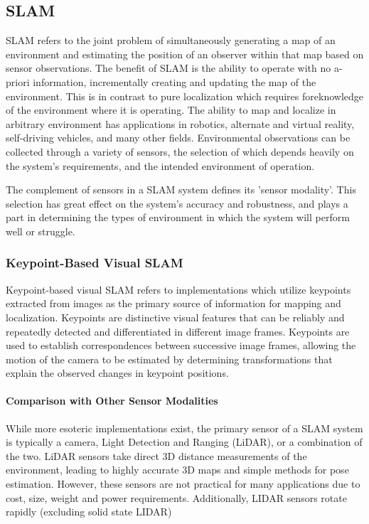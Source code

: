 \subsection{SLAM}

SLAM refers to the joint problem of simultaneously generating a map of an environment and estimating the position of an observer within that map based on sensor observations. The benefit of SLAM is the ability to operate with no a-priori information, incrementally creating and updating the map of the environment. This is in contrast to pure localization which requires foreknowledge of the environment where it is operating. The ability to map and localize in arbitrary environment has applications in robotics, alternate and virtual reality, self-driving vehicles, and many other fields. Environmental observations can be collected through a variety of sensors, the selection of which depends heavily on the system's requirements, and the intended environment of operation.

The complement of sensors in a SLAM system defines its 'sensor modality'. This selection has great effect on the system's accuracy and robustness, and plays a part in determining the types of environment in which the system will perform well or struggle.

\subsubsection{Keypoint-Based Visual SLAM}

Keypoint-based visual SLAM refers to implementations which utilize keypoints extracted from images as the primary source of information for mapping and localization. Keypoints are distinctive visual features that can be reliably and repeatedly detected and differentiated in different image frames. Keypoints are used to establish correspondences between successive image frames, allowing the motion of the camera to be estimated by determining transformations that explain the observed changes in keypoint positions.

\paragraph{Comparison with Other Sensor Modalities}

While more esoteric implementations exist, the primary sensor of a SLAM system is typically a camera, Light Detection and Ranging (LiDAR), or a combination of the two. LiDAR sensors take direct 3D distance measurements of the environment, leading to highly accurate 3D maps and simple methods for pose estimation. However, these sensors are not practical for many applications due to cost, size, weight and power requirements. Additionally, LIDAR sensors rotate rapidly (excluding solid state LIDAR)

